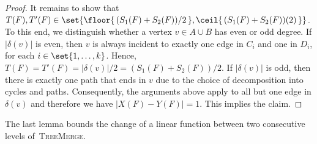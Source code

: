 \begin{proof}
    It remains to show that~$T(F), T'(F) \in \set{\floor{\,(S_1(F) + S_2(F))/2\,}, \ceil{\,(S_1(F) + S_2(F))(2)\,}}$.
    To this end, we distinguish whether a vertex $v \in A \cup B$ has even or odd degree. If $|\delta(v)|$ is even, then $v$ is always incident to exactly one edge in $C_i$ and one in $D_i$, for each $i\in\set{1,\dotsc,k}$.
    Hence, $T(F) = T'(F) = |\delta(v)| / 2 = (S_1(F) + S_2(F))/2$.
    If $|\delta(v)|$ is odd, then there is exactly one path that ends in $v$ due to the choice of decomposition into cycles and paths. 
    Consequently, the arguments above apply to all but one edge in $\delta(v)$ and therefore we have $|X(F) - Y(F)| = 1$. 
    This implies the claim.
\end{proof}

The last lemma bounds the change of a linear function between two consecutive levels of~\textsc{TreeMerge}.

\IncreaseOfLinearFunction*

